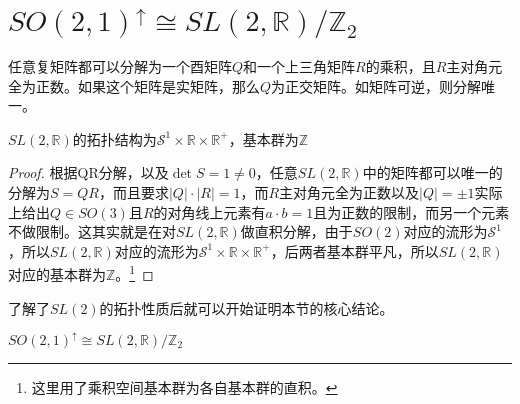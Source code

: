 \section{$SO(2,1)^\uparrow\cong SL(2,\mathbb{R})/\mathbb{Z}_2$}
\begin{lemma}[QR分解]
	任意复矩阵都可以分解为一个酉矩阵$Q$和一个上三角矩阵$R$的乘积，且$R$主对角元全为正数。如果这个矩阵是实矩阵，那么$Q$为正交矩阵。如矩阵可逆，则分解唯一。
\end{lemma}
\begin{lemma}
	$SL(2,\mathbb{R})$的拓扑结构为$\mathcal{S}^1\times \mathbb{R}\times\mathbb{R}^+$，基本群为$\mathbb{Z}$
\end{lemma}
\begin{proof}
	根据QR分解，以及$\det S=1\neq 0$，任意$SL(2,\mathbb{R})$中的矩阵都可以唯一的分解为$S=QR$，而且要求$|Q|\cdot|R|=1$，而$R$主对角元全为正数以及$|Q|=\pm 1$实际上给出$Q\in SO(3)$且$R$的对角线上元素有$a\cdot b=1$且为正数的限制，而另一个元素不做限制。这其实就是在对$SL(2,\mathbb{R})$做直积分解，由于$SO(2)$对应的流形为$\mathcal{S}^1$，所以$SL(2,\mathbb{R})$对应的流形为$\mathcal{S}^1\times \mathbb{R}\times\mathbb{R}^+$，后两者基本群平凡，所以$SL(2,\mathbb{R})$对应的基本群为$\mathbb{Z}$。\footnote{这里用了乘积空间基本群为各自基本群的直积。}
\end{proof}
了解了$SL(2)$的拓扑性质后就可以开始证明本节的核心结论。
\begin{theorem}
	$SO(2,1)^\uparrow\cong SL(2,\mathbb{R})/\mathbb{Z}_2$
\end{theorem}
